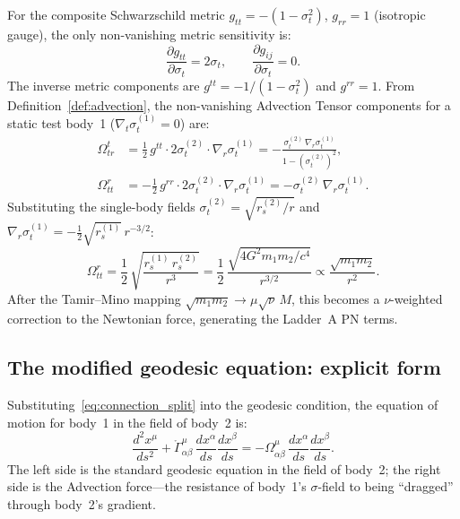 \documentclass[11pt,a4paper]{article}
\theoremstyle{plain}
\theoremstyle{definition}
\theoremstyle{remark}
\newcommand{\sigt}{\sigma_t}
\begin{document}
For the composite Schwarzschild metric $g_{tt} = -(1-\sigt^2)$, $g_{rr} = 1$
(isotropic gauge), the only non-vanishing metric sensitivity is:
\begin{equation}
  \frac{\partial g_{tt}}{\partial\sigt} = 2\sigt,
  \qquad
  \frac{\partial g_{ij}}{\partial\sigt} = 0.
  \label{eq:metric_sensitivity}
\end{equation}
The inverse metric components are $g^{tt} = -1/(1-\sigt^2)$ and $g^{rr} = 1$.
From Definition~\ref{def:advection}, the non-vanishing Advection Tensor components
for a static test body~1 ($\nabla_t\sigt^{(1)} = 0$) are:
\begin{align}
  \Omega^t_{tr}
  &= \frac{1}{2}\,g^{tt}\cdot 2\sigt^{(2)}\cdot\nabla_r\sigt^{(1)}
  = -\frac{\sigt^{(2)}\,\nabla_r\sigt^{(1)}}{1-(\sigt^{(2)})^2},
  \label{eq:Omega_ttr}\\
  \Omega^r_{tt}
  &= -\frac{1}{2}\,g^{rr}\cdot 2\sigt^{(2)}\cdot\nabla_r\sigt^{(1)}
  = -\sigt^{(2)}\,\nabla_r\sigt^{(1)}.
  \label{eq:Omega_rtt}
\end{align}
Substituting the single-body fields $\sigt^{(2)} = \sqrt{r_s^{(2)}/r}$ and
$\nabla_r\sigt^{(1)} = -\tfrac{1}{2}\sqrt{r_s^{(1)}}\,r^{-3/2}$:
\begin{equation}
  \Omega^r_{tt}
  = \frac{1}{2}\,\sqrt{\frac{r_s^{(1)}\,r_s^{(2)}}{r^3}}
  = \frac{1}{2}\,\frac{\sqrt{4G^2 m_1 m_2/c^4}}{r^{3/2}}
  \propto \frac{\sqrt{m_1 m_2}}{r^2}.
  \label{eq:Omega_rtt_explicit}
\end{equation}
After the Tamir--Mino mapping $\sqrt{m_1 m_2} \to \mu\sqrt{\nu}\,M$, this becomes
a $\nu$-weighted correction to the Newtonian force, generating the Ladder~A PN terms.

\subsection{The modified geodesic equation: explicit form}

Substituting~\eqref{eq:connection_split} into the geodesic condition, the equation
of motion for body~1 in the field of body~2 is:
\begin{equation}
  \frac{d^2 x^\mu}{ds^2}
  + \mathring\Gamma^\mu_{\alpha\beta}\,\frac{dx^\alpha}{ds}\frac{dx^\beta}{ds}
  = -\Omega^\mu_{\alpha\beta}\,\frac{dx^\alpha}{ds}\frac{dx^\beta}{ds}.
  \label{eq:modified_geodesic_explicit}
\end{equation}
The left side is the standard geodesic equation in the field of body~2; the right
side is the Advection force---the resistance of body~1's $\sigma$-field to being
``dragged'' through body~2's gradient.
\end{document}

